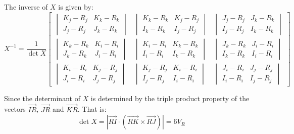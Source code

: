 \documentclass{article}
\begin{document}
The inverse of $X$ is given by:
	\begin{equation}	\label{eq:e3}
		X^{-1} = \frac{1}{\det{X}}
		\begin{bmatrix}
			\begin{vmatrix}
				K_{j} - R_{j} & K_{k} - R_{k} \\
				J_{j} - R_{j} & J_{k} - R_{k}
			\end{vmatrix} &
			\begin{vmatrix}
				K_{k} - R_{k} & K_{j} - R_{j} \\
				I_{k} - R_{k} & I_{j} - R_{j}
			\end{vmatrix} &
			\begin{vmatrix}
				J_{j} - R_{j} & J_{k} - R_{k} \\
				I_{j} - R_{j} & I_{k} - R_{k}
			\end{vmatrix}
		\\
			\begin{vmatrix}
				K_{k} - R_{k} & K_{i} - R_{i}  \\
				J_{k} - R_{k} & J_{i} - R_{i}
			\end{vmatrix} &
			\begin{vmatrix}
				K_{i} - R_{i} & K_{k} - R_{k}  \\
				I_{i} - R_{i} & I_{k} - R_{k}
			\end{vmatrix} &
			\begin{vmatrix}
				J_{k} - R_{k} & J_{i} - R_{i}  \\
				I_{k} - R_{k} & I_{i} - R_{i} 
			\end{vmatrix}
		\\
			\begin{vmatrix}
				K_{i} - R_{i} & K_{j} - R_{j}  \\
			    J_{i} - R_{i} & J_{j} - R_{j}
			\end{vmatrix} &
			\begin{vmatrix}
				K_{j} - R_{j} & K_{i} - R_{i} \\
				I_{j} - R_{j} & I_{i} - R_{i}
			\end{vmatrix} &
			\begin{vmatrix}
				J_{i} - R_{i} & J_{j} - R_{j} \\
				I_{i} - R_{i} & I_{j} - R_{j} 
			\end{vmatrix}
		\end{bmatrix}		
	\end{equation}

Since the determinant of $X$ is determined by the triple product property of the vectors $\vec{IR}$, $\vec{JR}$ and $\vec{KR}$. That is:
	\begin{displaymath}
	\det{X} = |\vec{RI}\cdot(\vec{RK} \times \vec{RJ})| = 6V_{R}
	\end{displaymath}
\end{document}
